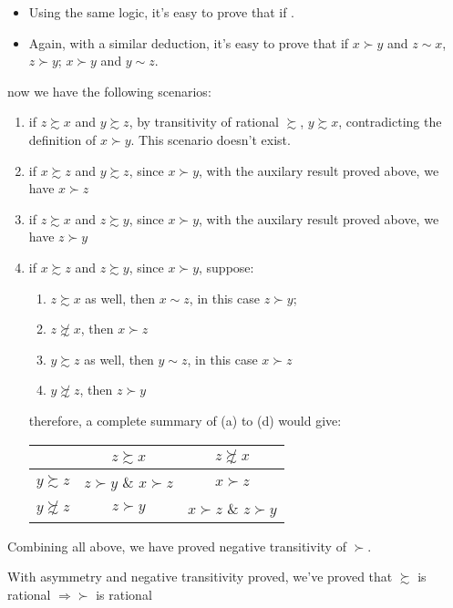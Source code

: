 \begin{description}
\begin{itemize}
        \begin{itemize}
       \item Using the same logic, it's easy to prove that if .
        \item Again, with a similar deduction, it's easy to prove that if $x\succ y$
        and $z\sim x$, $z\succ y$; $x\succ y$ and $y\sim z$.
        \end{itemize}
        now we have the following scenarios:
        \begin{enumerate}
        \item if $z\succsim x$ and $y\succsim z$, by transitivity of rational
        $\succsim$, $y\succsim x$, contradicting the definition of $x\succ y$.
        This scenario doesn't exist.
        \item if $x\succsim z$ and $y\succsim z$, since $x\succ y$, with the
        auxilary result proved above, we have $x\succ z$
        \item if $z\succsim x$ and $z\succsim y$, since $x\succ y$, with the
        auxilary result proved above, we have $z\succ y$
        \item if $x\succsim z$ and $z\succsim y$, since $x\succ y$, suppose:
        \begin{enumerate}
        \item $z\succsim x$ as well, then $x\sim z$, in this case $z\succ y$;
        \item $z\not\succsim x$, then $x\succ z$
        \item $y\succsim z$ as well, then $y\sim z$, in this case $x\succ z$
        \item $y\not\succsim z$, then $z\succ y$
        \end{enumerate}
        therefore, a complete summary of (a) to (d) would give:
        
        \begin{table}[h]
        \begin{centering}
        \begin{tabular}{ccc}
        \hline 
         & $z\succsim x$ & $z\not\succsim x$\tabularnewline
        \hline 
        $y\succsim z$ & $z\succ y$ \& $x\succ z$ & $x\succ z$\tabularnewline
        $y\not\succsim z$ & $z\succ y$ & $x\succ z$ \& $z\succ y$\tabularnewline
        \hline 
        \end{tabular}
        \par\end{centering}
        \end{table}
        
        \end{enumerate}
        Combining all above, we have proved negative transitivity of $\succ$.
        \end{itemize}
        With asymmetry and negative transitivity proved, we've proved that
        $\succsim$ is rational $\Rightarrow$$\succ$ is rational
        
\end{description}